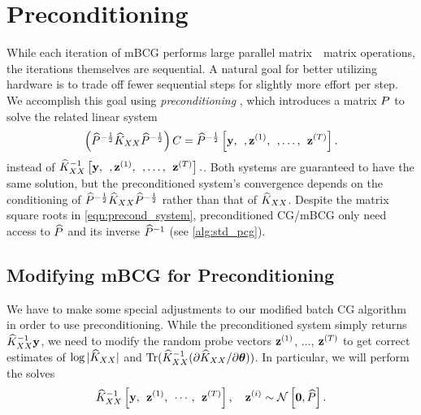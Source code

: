 \section{Preconditioning}
\label{sec:preconditioning}

While each iteration of mBCG performs large parallel matrix~\texttimes~matrix operations, the iterations themselves are sequential.
A natural goal for better utilizing hardware is to trade off fewer sequential steps for slightly more effort per step.
We accomplish this goal using \emph{preconditioning} \citep[e.g.][]{demmel1997applied,saad2003iterative,van2003iterative,golub2012matrix}, which introduces a matrix $P$ to solve the related linear system
\begin{equation}
  \left( \widehat{P}^{- \frac 1 2} \widehat{K}_{XX} \widehat{P}^{- \frac 1 2}\right) C = \widehat{P}^{- \frac 1 2} \left[ \mathbf{y}, \:\:, \mathbf{z}^{(1)}, \:\:, \ldots, \:\: \mathbf{z}^{(T)} \right].
  \label{eqn:precond_system}
\end{equation}
instead of $\widehat{K}_{XX}^{-1} \left[  \mathbf{y}, \:\:, \mathbf{z}^{(1)}, \:\:, \ldots, \:\: \mathbf{z}^{(T)} \right].$.
Both systems are guaranteed to have the same solution, but the preconditioned system's convergence depends on the conditioning of $\widehat{P}^{- \frac 1 2} \widehat{K}_{XX} \widehat{P}^{- \frac 1 2}$ rather than that of $\widehat{K}_{XX}$.
Despite the matrix square roots in \cref{eqn:precond_system}, preconditioned CG/mBCG only need access to $\widehat{P}$ and its inverse $\widehat{P}^{-1}$ (see \cref{alg:std_pcg}).



\subsection{Modifying mBCG for Preconditioning}
\label{sec:precond_requirements}
We have to make some special adjustments to our modified batch CG algorithm in order to use preconditioning.
While the preconditioned system simply returns $\widehat{K}_{XX}^{-1} \mathbf{y}$, we need to modify the random probe vectors $\mathbf{z}^{(1)}$, $\ldots$, $\mathbf{z}^{(T)}$ to get correct estimates of $\log \vert \widehat{K}_{XX} \vert$ and $\tr{ \trainK^{-1} ( \partial \trainK / \partial \btheta) }$.
In particular, we will perform the solves
%
\begin{equation}
  \label{eqn:mod_cg_call_precond}
  \trainK^{-1} \left[ \by, \:\: \bz^{(1)}, \:\: \cdots, \:\: \bz^{(T)} \right], \quad \bz^{(i)} \sim \normaldist{\bzero}{\trainP}.
\end{equation}

